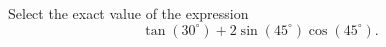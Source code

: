 \documentclass{ximera}
\author{Ivo Terek}
\begin{document}
\begin{exercise}

Select the exact value of the expression $$\tan(30^\circ) + 2\sin(45^\circ)\cos(45^\circ).$$
\begin{multipleChoice}
\end{multipleChoice}

\end{exercise}
\end{document}
